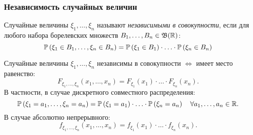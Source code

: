 \subsubsection{Независимость случайных величин}
\begin{defn}
    Случайные величины $\xi_1, \ldots, \xi_n$ называют \textit{независимыми в совокупности}, если для любого набора борелевских множеств $B_{1}, \ldots, B_{n} \in \mathfrak{B}(\mathbb{R})$:
    \begin{equation*}
        \operatorname{\mathbb{P}}\left(\xi_{1} \in B_{1}, \ldots, \xi_{n} \in B_{n}\right)=\operatorname{\mathbb{P}}\left(\xi_{1} \in B_{1}\right) \cdot \ldots \cdot \operatorname{\mathbb{P}}\left(\xi_{n} \in B_{n}\right)
    \end{equation*}
\end{defn}
\begin{namedthm}
    Случайные величины $\xi_1, \ldots, \xi_n$ независимы в совокупности $\iff$ имеет место равенство:
    \begin{equation*}
        F_{\xi_{1}, \ldots, \xi_{n}}\left(x_{1}, \ldots, x_{n}\right)=F_{\xi_{1}}\left(x_{1}\right) \cdot \ldots \cdot F_{\xi_{n}}\left(x_{n}\right).
    \end{equation*}
    В частности, в случае дискретного совместного распределения:
    \begin{equation*}
        \operatorname{\mathbb{P}}\left(\xi_{1}=a_{1}, \ldots, \xi_{n}=a_{n}\right)=\operatorname{\mathbb{P}}\left(\xi_{1}=a_{1}\right) \cdot \ldots \cdot \operatorname{\mathbb{P}}\left(\xi_{n}=a_{n}\right) \quad \forall a_1, \ldots, a_n \in \mathbb{R}.
    \end{equation*}
    В случае абсолютно непрерывного:
    \begin{equation*}
        f_{\xi_{1}, \ldots, \xi_{n}}\left(x_{1}, \ldots, x_{n}\right)=f_{\xi_{1}}\left(x_{1}\right) \cdot \ldots \cdot f_{\xi_{n}}\left(x_{n}\right).
    \end{equation*}
\end{namedthm}

